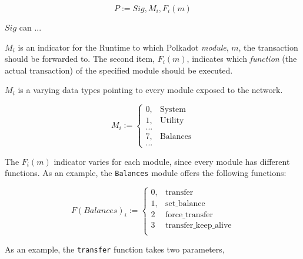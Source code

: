 \[
    P := Sig, M_i, F_i(m)
\]

$Sig$ can ...
\newline

$M_i$ is an indicator for the Runtime to which Polkadot \textit{module}, $m$,
the transaction should be forwarded to. The second item, $F_i(m)$, indicates
which \textit{function} (the actual transaction) of the specified module should
be executed.
\newline

$M_i$ is a varying data types pointing to every module exposed to the network.

\[
M_i :=
\begin{cases}
0, & \text{System} \\
1, & \text{Utility} \\
... & \\
7, & \text{Balances} \\
... &
\end{cases}
\]

The $F_i(m)$ indicator varies for each module, since every module has different
functions. As an example, the \verb|Balances| module offers the following
functions:

\[
F(Balances)_i :=
\begin{cases}
0, & \text{transfer} \\
1, & \text{set\_balance} \\
2 & \text{force\_transfer} \\
3 & \text{transfer\_keep\_alive} \\
\end{cases}
\]

As an example, the \verb|transfer| function takes two parameters, 
